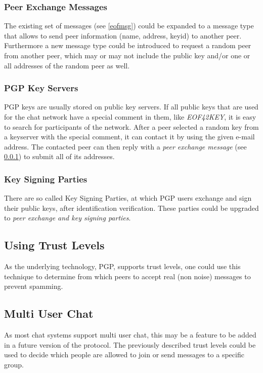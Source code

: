 \subsubsection{Peer Exchange Messages}
\label{peerexchange}
The existing set of messages (see \ref{eofmsg}) could be expanded to a message
type that allows to send peer information (name, address, keyid) to another
peer. Furthermore a new message type could be introduced to request a random
peer from another peer, which may or may not include the public key 
and/or one or all addresses of the random peer as well.
\subsubsection{PGP Key Servers}
PGP keys are usually stored on public key servers.
If all public keys that are used for the chat network have a special comment
in them, like \textit{EOF42KEY}, it is easy to search for participants of the
network. After a peer selected a random key from a keyserver with the
special comment, it can contact it by using the given e-mail address.
The contacted peer can then reply with a \textit{peer exchange message}
(see \ref{peerexchange}) to submit all of its addresses.
\subsubsection{Key Signing Parties}
There are so called Key Signing Parties, at which PGP users exchange and
sign their public keys, after identification verification.
These parties could be upgraded to \textit{peer exchange and key signing
parties}.
\subsection{Using Trust Levels}
As the underlying technology, PGP, supports trust levels, one could use this
technique to determine from which peers to accept real (non noise)
messages to prevent spamming.
\subsection{Multi User Chat}
As most chat systems support multi user chat, this may be a feature to be added
in a future version of the protocol. The previously described trust levels
could be used to decide which people are allowed to join or send messages
to a specific group.

